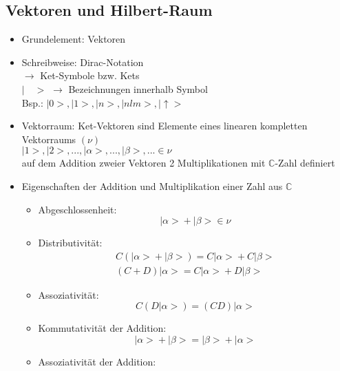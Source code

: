 \documentclass[10pt,article,colorback,accentcolor=tud9d]{scrartcl}
\begin{document}
\subsection{Vektoren und Hilbert-Raum}
\begin{itemize}
\item Grundelement: Vektoren
\item Schreibweise: Dirac-Notation\\
$\rightarrow$ Ket-Symbole bzw. Kets\\
$\left| \quad > \right.$ $\rightarrow$ Bezeichnungen innerhalb Symbol\\
Bsp.: $\left| 0>\right.,\left|1>\right.,\left|n>\right.,\left|nlm>\right.,\left| \uparrow>\right.$
\item Vektorraum: Ket-Vektoren sind Elemente eines linearen kompletten Vektorraums $(\nu)$\\
$\left|1>\right.,\left|2>\right.,...,\left|\alpha>\right.,...,\left|\beta>\right.,... \in \nu$\\
auf dem Addition zweier Vektoren 2 Multiplikationen mit $\mathbb{C}$-Zahl definiert
\item Eigenschaften der Addition und Multiplikation einer Zahl aus $\mathbb{C}$
\begin{fleqn}
\begin{itemize}
\item Abgeschlossenheit: 
\begin{equation} 
\left| \alpha >\right.+\left|\beta>\right. \in \nu
\end{equation}
\item Distributivität: 
\begin{equation}
\begin{aligned}
C(\left|\alpha>\right. +\left|\beta>\right.) = C\left|\alpha>\right. +C\left|\beta>\right.\\
(C+D)\left|\alpha>\right. = C\left|\alpha>\right. +D\left|\beta>\right.
\end{aligned}
\end{equation}
\item Assoziativität: 
\begin{equation}
C(D\left|\alpha>\right.)=(CD)\left|\alpha>\right.
\end{equation}
\item Kommutativität der Addition: 
\begin{equation}
\left|\alpha>\right. + \left|\beta>\right. =\left|\beta>\right. + \left|\alpha>\right.
\end{equation}
\item Assoziativität der Addition: 

\end{itemize}
\end{fleqn}
\end{itemize}
\end{document}
